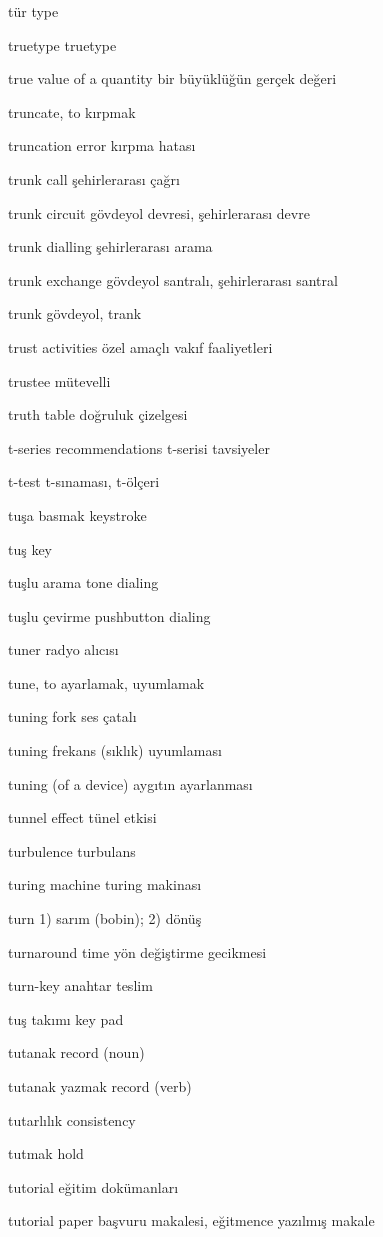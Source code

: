 \documentclass[12pt,fleqn]{article}\usepackage{../../common}
\begin{document}
tür type

truetype truetype

true value of a quantity bir büyüklüğün gerçek değeri

truncate, to kırpmak

truncation error kırpma hatası

trunk call şehirlerarası çağrı

trunk circuit gövdeyol devresi, şehirlerarası devre

trunk dialling şehirlerarası arama

trunk exchange gövdeyol santralı, şehirlerarası santral

trunk gövdeyol, trank

trust activities özel amaçlı vakıf faaliyetleri

trustee mütevelli

truth table doğruluk çizelgesi

t-series recommendations t-serisi tavsiyeler

t-test t-sınaması, t-ölçeri

tuşa basmak keystroke

tuş key

tuşlu arama tone dialing

tuşlu çevirme pushbutton dialing

tuner radyo alıcısı

tune, to ayarlamak, uyumlamak

tuning fork ses çatalı

tuning frekans (sıklık) uyumlaması

tuning (of a device) aygıtın ayarlanması

tunnel effect tünel etkisi

turbulence turbulans

turing machine turing makinası

turn 1) sarım (bobin); 2) dönüş

turnaround time yön değiştirme gecikmesi

turn-key anahtar teslim

tuş takımı key pad

tutanak record (noun)

tutanak yazmak record (verb)

tutarlılık consistency

tutmak hold

tutorial eğitim dokümanları

tutorial paper başvuru makalesi, eğitmence yazılmış makale
\end{document}
